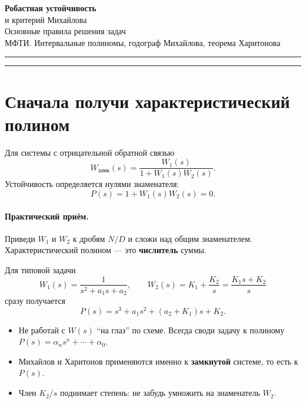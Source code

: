 \documentclass[11pt,a4paper]{article}
\begin{document}
\begin{center}
  {\LARGE\bfseries\color{ruleblue} Робастная устойчивость}\\[0.35em]
  {\Large и критерий Михайлова}\\[0.6em]
  {\large Основные правила решения задач}\\[0.4em]
  {\normalsize\color{rulegray} МФТИ. Интервальные полиномы, годограф Михайлова, теорема Харитонова}
\end{center}

\vspace{0.4em}
\noindent\textcolor{ruleblue}{\rule{\textwidth}{0.8pt}}

\tableofcontents
\vspace{0.3em}
\noindent\textcolor{ruleblue}{\rule{\textwidth}{0.4pt}}

\section{Сначала получи характеристический полином}

Для системы с отрицательной обратной связью
\[
W_{\mathrm{замк}}(s)=\frac{W_1(s)}{1+W_1(s)W_2(s)}.
\]
Устойчивость определяется нулями знаменателя:
\[
P(s)=1+W_1(s)W_2(s)=0.
\]

\paragraph{Практический приём.}
Приведи \(W_1\) и \(W_2\) к дробям \(N/D\) и сложи над общим знаменателем.
Характеристический полином --- это \textbf{числитель} суммы.

Для типовой задачи
\[
W_1(s)=\frac{1}{s^2+a_1 s+a_2},\qquad
W_2(s)=K_1+\frac{K_2}{s}=\frac{K_1 s+K_2}{s}
\]
сразу получается
\[
P(s)=s^3+a_1 s^2+(a_2+K_1)s+K_2.
\]

\begin{itemize}
  \item Не работай с \(W(s)\) ``на глаз'' по схеме. Всегда своди задачу к полиному
        \(P(s)=\alpha_n s^n+\cdots+\alpha_0\).
  \item Михайлов и Харитонов применяются именно к \textbf{замкнутой} системе, то есть к \(P(s)\).
  \item Член \(K_2/s\) поднимает степень: не забудь умножить на знаменатель \(W_2\).
\end{itemize}

\end{document}
